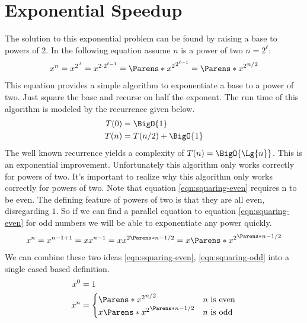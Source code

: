 \documentclass[./Thesis.tex]{subfiles}
\begin{document}
\section{Exponential Speedup}
\label{sec:exponential-speedup}
The solution to this exponential problem can be found by raising a base to
powers of 2. In the following equation assume $n$ is a power of two $n = 2^\ell$:
\begin{align}
  \label{eqn:squaring-even}
  x^n = x^{2^{\, \ell}}
  {}  = x^{2 \cdot 2^{\ell - 1}}
  {}  = \Parens*{x^2}^{2^{\ell - 1}}
  {}  = \Parens*{x^2}^{n / 2}
\end{align}
This equation provides a simple algorithm to exponentiate a base to a power of
two. Just square the base and recurse on half the exponent. The run time of this
algorithm is modeled by the recurrence given below.
\begin{align}
  \label{eqn:power-of-two-recurrance}
  \begin{split}
    T(0) &= \BigO{1} \\
    T(n) &= T(n / 2) + \BigO{1}
  \end{split}
\end{align}
The well known recurrence yields a complexity of $T(n) = \BigO{\Lg{n}}$. This is an
exponential improvement. Unfortunately this algorithm only works correctly for
powers of two. It's important to realize why this algorithm only works correctly
for powers of two. Note that equation \ref{eqn:squaring-even} requires n to be
even. The defining feature of powers of two is that they are all even,
disregarding $1$. So if we can find a parallel equation to equation
\ref{eqn:squaring-even} for odd numbers we will be able to exponentiate any power
quickly.
\begin{align}
  \label{eqn:squaring-odd}
  x^n = x^{n - 1 + 1} = x x^{n - 1} = x x^{2\Parens*{n - 1} / 2} = x \Parens*{x^2}^{\Parens*{n - 1} / 2}
\end{align}
We can combine these two ideas \ref{eqn:squaring-even}, \ref{eqn:squaring-odd}
into a single cased based definition.
\begin{align}
  \label{eqn:squaring-def-division}
  \begin{split}
    x^0 &= 1 \\
    x^n &=
    \begin{cases}
      \Parens*{x^2}^{n / 2} & n \text{ is even} \\
      x \Parens*{x^2}^{\Parens*{n - 1} / 2} & n \text{ is odd}
    \end{cases}
  \end{split}
\end{align}
\end{document}

